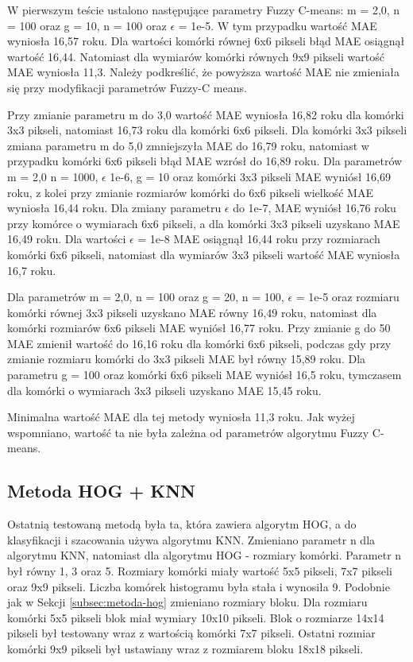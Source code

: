 \documentclass[a4paper,twoside,12pt]{book}
\begin{document}
    W pierwszym teście ustalono następujące parametry Fuzzy C-means: m = 2,0, n = 100 oraz g = 10, n = 100 oraz $\epsilon$ = 1e-5.
    W tym przypadku wartość MAE wyniosła 16,57 roku. Dla wartości komórki równej 6x6 pikseli błąd MAE osiągnął wartość 16,44. Natomiast dla
    wymiarów komórki równych 9x9 pikseli wartość MAE wyniosła 11,3. Należy podkreślić, że powyższa wartość MAE nie
    zmieniała się przy modyfikacji parametrów Fuzzy-C means.

    Przy zmianie parametru m do 3,0 wartość MAE wyniosła 16,82 roku dla komórki 3x3 pikseli, natomiast 16,73 roku dla
    komórki 6x6 pikseli. Dla komórki 3x3 pikseli zmiana parametru m do
    5,0 zmniejszyła MAE do 16,79 roku, natomiast w przypadku komórki 6x6 pikseli błąd MAE wzrósł do 16,89 roku.
    Dla parametrów m = 2,0 n = 1000, $\epsilon$ 1e-6, g = 10 oraz komórki 3x3 pikseli MAE wyniósł 16,69 roku,
    z kolei przy zmianie rozmiarów komórki do 6x6 pikseli wielkość MAE wyniosła 16,44 roku.
    Dla zmiany parametru $\epsilon$ do 1e-7, MAE wyniósł 16,76 roku przy komórce o wymiarach 6x6 pikseli, a dla komórki
    3x3 pikseli uzyskano MAE 16,49 roku.
    Dla wartości $\epsilon$ = 1e-8 MAE osiągnął 16,44 roku przy rozmiarach komórki 6x6 pikseli, natomiast dla wymiarów 3x3
    pikseli wartość MAE wyniosła 16,7 roku.

    Dla parametrów m = 2,0, n = 100 oraz g = 20, n = 100, $\epsilon$ = 1e-5 oraz rozmiaru komórki równej 3x3 pikseli
    uzyskano MAE równy 16,49 roku, natomiast dla komórki rozmiarów 6x6 pikseli MAE wyniósł 16,77 roku.
    Przy zmianie g do 50 MAE zmienił wartość do 16,16 roku dla komórki 6x6 pikseli, podczas gdy przy zmianie rozmiaru komórki do
    3x3 pikseli MAE był równy 15,89 roku. Dla
    parametru g =
    100 oraz komórki 6x6 pikseli MAE
    wyniósł 16,5 roku, tymczasem dla komórki o wymiarach 3x3 pikseli uzyskano MAE 15,45 roku.

    Minimalna wartość MAE dla tej metody wyniosła 11,3 roku. Jak wyżej wspomniano, wartość ta nie była zależna od
    parametrów algorytmu Fuzzy C-means.


    \subsection{Metoda HOG + KNN}\label{subsec:metoda-hog-+-knn}

    Ostatnią testowaną metodą była ta, która zawiera algorytm HOG, a do klasyfikacji i szacowania używa algorytmu KNN.
    Zmieniano parametr n dla algorytmu KNN, natomiast dla algorytmu HOG - rozmiary komórki.
    Parametr n był równy 1, 3 oraz 5. Rozmiary komórki miały wartość 5x5 pikseli, 7x7 pikseli oraz 9x9 pikseli.
    Liczba komórek histogramu była stała i wynosiła 9. Podobnie jak w Sekcji \ref{subsec:metoda-hog} zmieniano
    rozmiary bloku. Dla rozmiaru komórki 5x5 pikseli blok miał wymiary 10x10 pikseli. Blok o rozmiarze 14x14 pikseli
    był testowany wraz z wartością komórki 7x7 pikseli. Ostatni rozmiar komórki 9x9 pikseli był ustawiany wraz z
    rozmiarem bloku 18x18 pikseli.
\end{document}
